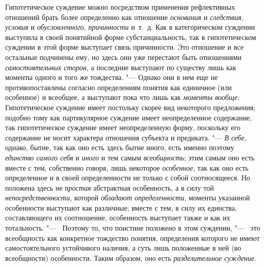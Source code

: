 {Гипотетическое суждение можно посредством применения
рефлективных отношений брать более определенно как отношение
{\em основания} и
{\em следствия},
{\em условия} и
{\em обусловленного},
{\em причинности} и~т.~д.
Как в категорическом суждении выступила в своей понятийной форме
субстанциальность, так в гипотетическом суждении в этой форме выступает
связь причинности. Это отношение и все остальные подчинены ему, но здесь
они уже перестают быть отношениями
{\em самостоятельных сторон},
а последние выступают по существу лишь как моменты одного и
того же тождества. "--- Однако они в нем еще не
противопоставлены согласно определениям понятия как единичное (или
особенное) и всеобщее, а выступают пока что лишь как
{\em моменты вообще}.
Гипотетическое суждение имеет постольку скорее вид некоторого
предложения; подобно тому как партикулярное суждение имеет неопределенное
содержание, так гипотетическое суждение имеет неопределенную форму,
поскольку его содержание не носит характера отношения субъекта и
предиката. "--- {\em В себе},
однако, бытие, так как оно есть здесь бытие иного, есть
именно поэтому {\em единство самого
себя} и {\em иного}
и тем самым
{\em всеобщность}; этим
самым оно есть вместе с тем, собственно говоря, лишь некоторое
{\em особенное}, так как
оно есть определенное и в своей определенности не только с собой
соотносящееся. Но положена здесь не
{\em простая} абстрактная
особенность, а в силу той
{\em непосредственности},
которой {\em обладают
определенности}, моменты указанной особенности выступают как
различные; вместе с тем, в силу их единства, составляющего их соотношение,
особенность выступает также и как их тотальность. "---
\ Поэтому то, что поистине положено в этом суждении, "---
\ это всеобщность как конкретное тождество понятия,
определения которого не имеют самостоятельного устойчивого наличия, а суть
лишь положенные в ней (во всеобщности) особенности. Таким образом, оно есть
{\em разделительное суждение}.

}
